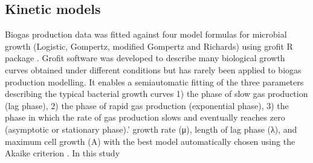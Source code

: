 \subsection{Kinetic models}
Biogas production data was fitted against four model formulas for microbial growth (Logistic, Gompertz, modified Gompertz and Richards) using grofit R package \cite{Kahm_2010}. Grofit software was developed to describe many biological growth curves obtained under different conditions but has rarely been applied to biogas production modelling. It enables a semiautomatic fitting of the three parameters describing the typical bacterial growth curves 1) the phase of slow gas production (lag phase), 2) the phase of rapid gas production (exponential phase), 3) the phase in which the rate of gas production slows and eventually reaches zero (asymptotic or stationary phase).’ growth rate (μ), length of lag phase (λ), and maximum cell growth (A) with the best model automatically chosen using the Akaike criterion \cite{Hasenbrink_2006}. In this study